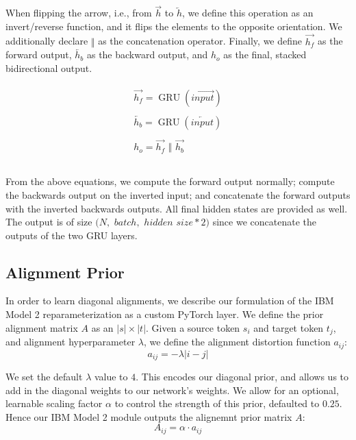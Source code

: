 \documentclass[twoside,twocolumn]{article}
\begin{document}
When flipping the arrow, i.e., from $\overrightarrow{h}$ to
$\overleftarrow{h}$, we define this operation as an invert/reverse
function, and it flips the elements to the opposite orientation. We
additionally declare $\Vert$ as the concatenation operator. Finally, we
define $\overrightarrow{h_f}$ as the forward output, $\overleftarrow{h_b}$
as the backward output, and $h_o$ as the final, stacked bidirectional output.

\begin{equation}
  \label{eq:bidirectional}
  \begin{split}
    \begin{array}{ll}
      \overrightarrow{h_f} = \operatorname{GRU}(\overrightarrow{input})\\
      \\
      \overleftarrow{h_b} = \operatorname{GRU}(\overleftarrow{input})\\
      \\
      h_o = \overrightarrow{h_f} \,\,\Vert \,\, \overrightarrow{h_b}\\
      \\
    \end{array}
  \end{split}
\end{equation}

From the above equations, we compute the forward output normally; compute the
backwards output on the inverted input; and concatenate the forward outputs
with the inverted backwards outputs. All final hidden states are provided as
well. The output is of size $(N,$ $batch,$ $hidden$ $size*2)$ since we
concatenate the outputs of the two GRU layers.

\subsection{Alignment Prior}
\label{sec:alignment_prior}
In order to learn diagonal alignments, we describe our formulation of the
IBM Model 2 reparameterization as a custom PyTorch layer. We define the prior
alignment matrix $A$ as an $|s| \times |t|$. Given a source token $s_i$ and
target token $t_j$, and alignment hyperparameter $\lambda$, we define the
alignment distortion function $a_{ij}$:
\begin{equation}
  a_{ij} = -\lambda | i - j |
\end{equation}

We set the default $\lambda$ value to $4$. This encodes our diagonal prior,
and allows us to add in the diagonal weights to our network's weights. We
allow for an optional, learnable scaling factor $\alpha$ to control the
strength of this prior, defaulted to $0.25$. Hence our IBM Model 2 module
outputs the alignemnt prior matrix $A$:
\begin{equation}
  A_{ij} = \alpha \cdot a_{ij}
\end{equation}
\end{document}
